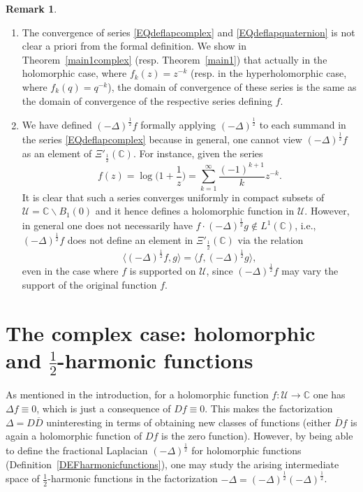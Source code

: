 \documentclass[reqno,11pt]{amsart}
\theoremstyle{definition}
\newtheorem{remark}[theorem]{Remark}
\begin{document}
\begin{remark}\begin{enumerate}[wide,label=\textnormal{(\roman{*})}]
		\item The convergence of series \eqref{EQdeflapcomplex} and \eqref{EQdeflapquaternion} is not clear a priori from the formal definition. We show in Theorem~\ref{main1complex} (resp. Theorem~\ref{main1}) that actually in the holomorphic case, where $f_k(z)=z^{-k}$ (resp. in the hyperholomorphic case, where $f_k(q)=q^{-k}$), the domain of convergence of these series is the same as the domain of convergence of the respective series defining $f$.
		
		\item We have defined $(-\Delta)^\frac{1}{2}f$ formally applying $(-\Delta)^\frac{1}{2}$ to each summand in the series \eqref{EQdeflapcomplex} because in general, one cannot view $(-\Delta)^\frac{1}{2}f$ as an element of $\Xi'_\frac{1}{2}(\mathbb{C})$. For instance, given the series
		\[
		f(z) = \log \bigg(1+\frac{1}{z}\bigg)= \sum_{k=1}^\infty \frac{(-1)^{k+1}}{k}z^{-k}.
		\]
		It is clear that such a series converges uniformly in compact subsets of $\mathcal{U}=\mathbb{C}\backslash B_1(0)$ and it hence defines a holomorphic function in $\mathcal{U}$. However, in general one does not necessarily have  $f\cdot (-\Delta)^\frac{1}{2}g\not\in L^1(\mathbb{C})$, i.e., $(-\Delta)^\frac{1}{2}f$ does not define an element in $\Xi'_\frac{1}{2}(\mathbb{C})$ via the relation
		\[
		\big\langle (-\Delta)^\frac{1}{2} f, g\big\rangle= 	\big\langle  f, (-\Delta)^\frac{1}{2}g\big\rangle,
		\]
		even in the case where $f$ is supported on $\mathcal{U}$, since $(-\Delta)^\frac{1}{2}f$ may vary the support of the original function $f$.
	\end{enumerate}
\end{remark}



	




\section{The complex case: holomorphic and $\frac{1}{2}$-harmonic functions}\label{SECcomplex}


As mentioned in the introduction, for a holomorphic function $f:\mathcal{U}\to \mathbb{C}$ one has $\Delta f\equiv0$, which is just a consequence of $Df\equiv 0$. This makes the factorization $\Delta=D\overline{D}$ uninteresting in terms of obtaining new classes of functions (either $\overline{D}f$ is again a holomorphic function of $Df$ is the zero function). However, by being able to define the fractional Laplacian $(-\Delta)^\frac{1}{2}$ for holomorphic functions (Definition~\ref{DEFharmonicfunctions}), one may study the  arising intermediate space of $\frac{1}{2}$-harmonic functions in the factorization $-\Delta=(-\Delta)^\frac{1}{2}(-\Delta)^\frac{1}{2}$.
\end{document}

